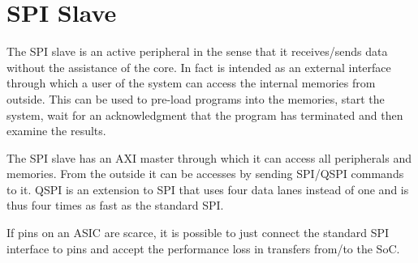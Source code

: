 \chapter{SPI Slave}
\label{chap:spi_slave}

The SPI slave is an active peripheral in the sense that it receives/sends data
without the assistance of the core. In fact is intended as an external interface
through which a user of the system can access the internal memories from
outside.
This can be used to pre-load programs into the memories, start the system, wait
for an acknowledgment that the program has terminated and then examine the
results.

The SPI slave has an AXI master through which it can access all peripherals and
memories. From the outside it can be accesses by sending SPI/QSPI commands to it.
QSPI is an extension to SPI that uses four data lanes instead of one and is thus
four times as fast as the standard SPI.

If pins on an ASIC are scarce, it is possible to just connect the standard SPI
interface to pins and accept the performance loss in transfers from/to the SoC.
